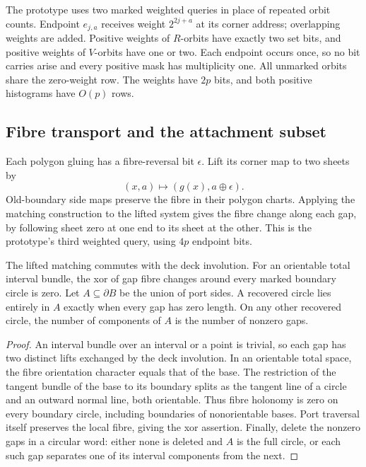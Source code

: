 The prototype uses two marked weighted queries in place of repeated orbit
counts.  Endpoint $e_{j,a}$ receives weight $2^{2j+a}$ at its corner address;
overlapping weights are added.  Positive weights of $R$-orbits have exactly
two set bits, and positive weights of $V$-orbits have one or two.  Each
endpoint occurs once, so no bit carries arise and every positive mask has
multiplicity one.  All unmarked orbits share the zero-weight row.  The
weights have $2p$ bits, and both positive histograms have $O(p)$ rows.

\subsection{Fibre transport and the attachment subset}

Each polygon gluing has a fibre-reversal bit $\epsilon$.  Lift its corner
map to two sheets by
\[
                    (x,a)\longmapsto(g(x),a\oplus\epsilon).
\]
Old-boundary side maps preserve the fibre in their polygon charts.
Applying the matching construction to the lifted system gives the fibre
change along each gap, by following sheet zero at one end to its sheet at
the other.  This is the prototype's third weighted query, using $4p$
endpoint bits.

\begin{proposition}
\label{prop:interface-consistency}
The lifted matching commutes with the deck involution.  For an orientable
total interval bundle, the xor of gap fibre changes around every marked
boundary circle is zero.  Let $A\subseteq\partial B$ be the union of port
sides.  A recovered circle lies entirely in $A$ exactly when every gap has
zero length.  On any other recovered circle, the number of components of
$A$ is the number of nonzero gaps.
\end{proposition}
\begin{proof}
An interval bundle over an interval or a point is trivial, so each gap has
two distinct lifts exchanged by the deck involution.  In an orientable
total space, the fibre orientation character equals that of the base.
The restriction of the tangent bundle of the base to its boundary splits
as the tangent line of a circle and an outward normal line, both orientable.
Thus fibre holonomy is zero on every boundary circle, including boundaries
of nonorientable bases.  Port traversal itself preserves the local fibre,
giving the xor assertion.  Finally, delete the nonzero gaps in a circular
word: either none is deleted and $A$ is the full circle, or each such gap
separates one of its interval components from the next.
\end{proof}

